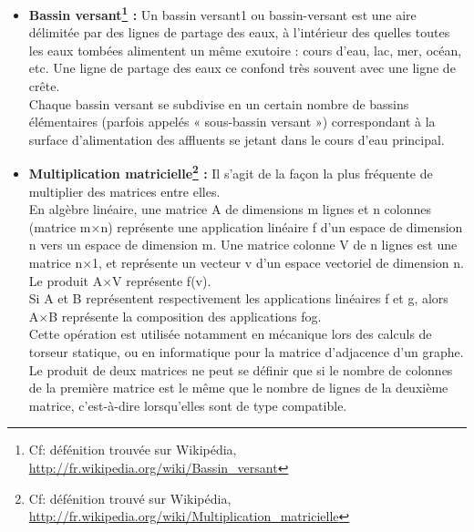 \begin{itemize}
	\item{\textbf{Bassin versant\footnote{Cf: défénition trouvée sur Wikipédia, \url{http://fr.wikipedia.org/wiki/Bassin_versant}} :} Un bassin versant1 ou bassin-versant est une aire délimitée par des lignes de partage des eaux, à l'intérieur des quelles toutes les eaux tombées alimentent un même exutoire : cours d'eau, lac, mer, océan, etc. Une ligne de partage des eaux ce confond très souvent avec une ligne de crête.\\

	Chaque bassin versant se subdivise en un certain nombre de bassins élémentaires (parfois appelés « sous-bassin versant ») correspondant à la surface d'alimentation des affluents se jetant dans le cours d'eau principal.\\}

	\item{\textbf{Multiplication matricielle\footnote{Cf: défénition trouvé sur Wikipédia, \url{http://fr.wikipedia.org/wiki/Multiplication_matricielle}} :} Il s'agit de la façon la plus fréquente de multiplier des matrices entre elles.\\
	En algèbre linéaire, une matrice A de dimensions m lignes et n colonnes (matrice m×n) représente une application linéaire f d'un espace de dimension n vers un espace de dimension m. Une matrice colonne V de n lignes est une matrice n×1, et représente un vecteur v d'un espace vectoriel de dimension n. Le produit A×V représente f(v).\\
	Si A et B représentent respectivement les applications linéaires f et g, alors A×B représente la composition des applications fog.\\
	Cette opération est utilisée notamment en mécanique lors des calculs de torseur statique, ou en informatique pour la matrice d'adjacence d'un graphe. \\
	Le produit de deux matrices ne peut se définir que si le nombre de colonnes de la première matrice est le même que le nombre de lignes de la deuxième matrice, c'est-à-dire lorsqu'elles sont de type compatible. \\}


\end{itemize}
